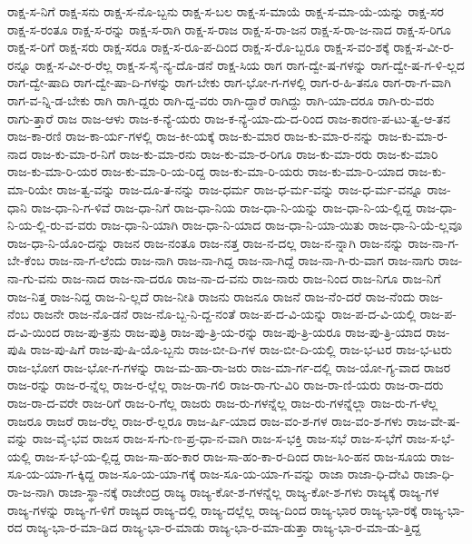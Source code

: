 {ರಾಕ್ಷ-ಸ-ನಿಗೆ
ರಾಕ್ಷ-ಸನು
ರಾಕ್ಷ-ಸ-ನೊ-ಬ್ಬನು
ರಾಕ್ಷ-ಸ-ಬಲ
ರಾಕ್ಷ-ಸ-ಮಾಯೆ
ರಾಕ್ಷ-ಸ-ಮಾ-ಯೆ-ಯನ್ನು
ರಾಕ್ಷ-ಸರ
ರಾಕ್ಷ-ಸ-ರಂತೂ
ರಾಕ್ಷ-ಸ-ರನ್ನು
ರಾಕ್ಷ-ಸ-ರಾಗಿ
ರಾಕ್ಷ-ಸ-ರಾಜ
ರಾಕ್ಷ-ಸ-ರಾ-ಜನ
ರಾಕ್ಷ-ಸ-ರಾ-ಜ-ನಾದ
ರಾಕ್ಷ-ಸ-ರಿಗೂ
ರಾಕ್ಷ-ಸ-ರಿಗೆ
ರಾಕ್ಷ-ಸರು
ರಾಕ್ಷ-ಸರೂ
ರಾಕ್ಷ-ಸ-ರೂ-ಪ-ದಿಂದ
ರಾಕ್ಷ-ಸ-ರೊ-ಬ್ಬರೂ
ರಾಕ್ಷ-ಸ-ವಂ-ಶಕ್ಕೆ
ರಾಕ್ಷ-ಸ-ವೀ-ರ-ರನ್ನೂ
ರಾಕ್ಷ-ಸ-ವೀ-ರ-ರೆಲ್ಲ
ರಾಕ್ಷ-ಸ-ಸೈ-ನ್ಯ-ದೊ-ಡನೆ
ರಾಕ್ಷ-ಸಿಯ
ರಾಗ
ರಾಗ-ದ್ವೇ-ಷ-ಗಳನ್ನು
ರಾಗ-ದ್ವೇ-ಷ-ಗ-ಳಿ-ಲ್ಲದ
ರಾಗ-ದ್ವೇ-ಷಾದಿ
ರಾಗ-ದ್ವೇ-ಷಾ-ದಿ-ಗಳನ್ನು
ರಾಗ-ಬೇಕು
ರಾಗ-ಭೋ-ಗ-ಗಳಲ್ಲಿ
ರಾಗ-ರ-ಹಿ-ತನೂ
ರಾಗ-ರಾ-ಗ-ವಾಗಿ
ರಾಗ-ವ-ನ್ನಿ-ಡ-ಬೇಕು
ರಾಗಿ
ರಾಗಿ-ದ್ದರು
ರಾಗಿ-ದ್ದ-ವರು
ರಾಗಿ-ದ್ದಾರೆ
ರಾಗಿದ್ದು
ರಾಗಿ-ಯಾ-ದರೂ
ರಾಗಿ-ರು-ವರು
ರಾಗು-ತ್ತಾರೆ
ರಾಜ
ರಾಜ-ಆಳು
ರಾಜ-ಕ-ನ್ಯೆ-ಯರು
ರಾಜ-ಕ-ನ್ಯೆ-ಯಾ-ದು-ದ-ರಿಂದ
ರಾಜ-ಕಾರಣ-ಪ-ಟು-ತ್ವ-ಆ-ತನ
ರಾಜ-ಕಾ-ರಣಿ
ರಾಜ-ಕಾ-ರ್ಯ-ಗಳಲ್ಲಿ
ರಾಜ-ಕೀ-ಯಕ್ಕೆ
ರಾಜ-ಕು-ಮಾರ
ರಾಜ-ಕು-ಮಾ-ರ-ನನ್ನು
ರಾಜ-ಕು-ಮಾ-ರ-ನಾದ
ರಾಜ-ಕು-ಮಾ-ರ-ನಿಗೆ
ರಾಜ-ಕು-ಮಾ-ರನು
ರಾಜ-ಕು-ಮಾ-ರ-ರಿಗೂ
ರಾಜ-ಕು-ಮಾ-ರರು
ರಾಜ-ಕು-ಮಾರಿ
ರಾಜ-ಕು-ಮಾ-ರಿ-ಯರ
ರಾಜ-ಕು-ಮಾ-ರಿ-ಯ-ರಿದ್ದ
ರಾಜ-ಕು-ಮಾ-ರಿ-ಯರು
ರಾಜ-ಕು-ಮಾ-ರಿ-ಯಾದ
ರಾಜ-ಕು-ಮಾ-ರಿಯೇ
ರಾಜ-ತ್ವ-ವನ್ನು
ರಾಜ-ದೂ-ತ-ನನ್ನು
ರಾಜ-ಧರ್ಮ
ರಾಜ-ಧ-ರ್ಮ-ವನ್ನು
ರಾಜ-ಧ-ರ್ಮ-ವನ್ನೂ
ರಾಜ-ಧಾನಿ
ರಾಜ-ಧಾ-ನಿ-ಗ-ಳಿವೆ
ರಾಜ-ಧಾ-ನಿಗೆ
ರಾಜ-ಧಾ-ನಿಯ
ರಾಜ-ಧಾ-ನಿ-ಯನ್ನು
ರಾಜ-ಧಾ-ನಿ-ಯ-ಲ್ಲಿದ್ದ
ರಾಜ-ಧಾ-ನಿ-ಯ-ಲ್ಲಿ-ರು-ವ-ವರು
ರಾಜ-ಧಾ-ನಿ-ಯಾಗಿ
ರಾಜ-ಧಾ-ನಿ-ಯಾದ
ರಾಜ-ಧಾ-ನಿ-ಯಾ-ಯಿತು
ರಾಜ-ಧಾ-ನಿ-ಯೆ-ಲ್ಲವೂ
ರಾಜ-ಧಾ-ನಿ-ಯೊಂ-ದನ್ನು
ರಾಜನ
ರಾಜ-ನಂತೂ
ರಾಜ-ನತ್ತ
ರಾಜ-ನ-ದಲ್ಲ
ರಾಜ-ನ-ನ್ನಾಗಿ
ರಾಜ-ನನ್ನು
ರಾಜ-ನಾ-ಗ-ಬೇ-ಕೆಂಬ
ರಾಜ-ನಾ-ಗ-ಲೆಂದು
ರಾಜ-ನಾಗಿ
ರಾಜ-ನಾ-ಗಿದ್ದ
ರಾಜ-ನಾ-ಗಿದ್ದೆ
ರಾಜ-ನಾ-ಗಿ-ರು-ವಾಗ
ರಾಜ-ನಾಗು
ರಾಜ-ನಾ-ಗು-ವನು
ರಾಜ-ನಾದ
ರಾಜ-ನಾ-ದರೂ
ರಾಜ-ನಾ-ದ-ವನು
ರಾಜ-ನಾರು
ರಾಜ-ನಿಂದ
ರಾಜ-ನಿಗೂ
ರಾಜ-ನಿಗೆ
ರಾಜ-ನಿತ್ತ
ರಾಜ-ನಿದ್ದ
ರಾಜ-ನಿ-ಲ್ಲದೆ
ರಾಜ-ನೀತಿ
ರಾಜನು
ರಾಜನೂ
ರಾಜನೆ
ರಾಜ-ನೆಂ-ದರೆ
ರಾಜ-ನೆಂದು
ರಾಜ-ನೆಂಬ
ರಾಜನೇ
ರಾಜ-ನೊ-ಡನೆ
ರಾಜ-ನೊ-ಬ್ಬ-ನಿ-ದ್ದ-ನಂತೆ
ರಾಜ-ಪ-ದ-ವಿ-ಯನ್ನು
ರಾಜ-ಪ-ದ-ವಿ-ಯಲ್ಲಿ
ರಾಜ-ಪ-ದ-ವಿ-ಯಿಂದ
ರಾಜ-ಪು-ತ್ರನು
ರಾಜ-ಪುತ್ರಿ
ರಾಜ-ಪು-ತ್ರಿ-ಯ-ರನ್ನು
ರಾಜ-ಪು-ತ್ರಿ-ಯರೂ
ರಾಜ-ಪು-ತ್ರಿ-ಯಾದ
ರಾಜ-ಪುಷಿ
ರಾಜ-ಪು-ಷಿಗೆ
ರಾಜ-ಪು-ಷಿ-ಯೊ-ಬ್ಬನು
ರಾಜ-ಬೀ-ದಿ-ಗಳ
ರಾಜ-ಬೀ-ದಿ-ಯಲ್ಲಿ
ರಾಜ-ಭ-ಟರ
ರಾಜ-ಭ-ಟರು
ರಾಜ-ಭೋಗ
ರಾಜ-ಭೋ-ಗ-ಗಳನ್ನು
ರಾಜ-ಮ-ಹಾ-ರಾ-ಜರು
ರಾಜ-ಮಾ-ರ್ಗ-ದಲ್ಲಿ
ರಾಜ-ಯೋ-ಗ್ಯ-ವಾದ
ರಾಜರ
ರಾಜ-ರನ್ನು
ರಾಜ-ರ-ನ್ನೆಲ್ಲ
ರಾಜ-ರ-ಲ್ಲೆಲ್ಲ
ರಾಜ-ರಾ-ಗಲಿ
ರಾಜ-ರಾ-ಗು-ವಿರಿ
ರಾಜ-ರಾ-ಣಿ-ಯರು
ರಾಜ-ರಾ-ದರು
ರಾಜ-ರಾ-ದ-ವರೇ
ರಾಜ-ರಿಗೆ
ರಾಜ-ರಿ-ಗೆಲ್ಲ
ರಾಜರು
ರಾಜ-ರು-ಗಳನ್ನೆಲ್ಲ
ರಾಜ-ರು-ಗಳನ್ನೆಲ್ಲಾ
ರಾಜ-ರು-ಗ-ಳೆಲ್ಲ
ರಾಜರೂ
ರಾಜರೆ
ರಾಜ-ರೆಲ್ಲ
ರಾಜ-ರೆ-ಲ್ಲರೂ
ರಾಜ-ರ್ಷಿ-ಯಾದ
ರಾಜ-ವಂ-ಶ-ಗಳ
ರಾಜ-ವಂ-ಶ-ಗಳು
ರಾಜ-ವೇ-ಷ-ವನ್ನು
ರಾಜ-ವೈ-ಭವ
ರಾಜಸ
ರಾಜ-ಸ-ಗು-ಣ-ಪ್ರ-ಧಾ-ನ-ವಾಗಿ
ರಾಜ-ಸ-ಭಕ್ತಿ
ರಾಜ-ಸಭೆ
ರಾಜ-ಸ-ಭೆಗೆ
ರಾಜ-ಸ-ಭೆ-ಯಲ್ಲಿ
ರಾಜ-ಸ-ಭೆ-ಯ-ಲ್ಲಿದ್ದ
ರಾಜ-ಸಾ-ಹಂ-ಕಾರ
ರಾಜ-ಸಾ-ಹಂ-ಕಾ-ರ-ದಿಂದ
ರಾಜ-ಸಿಂ-ಹನ
ರಾಜ-ಸೂಯ
ರಾಜ-ಸೂ-ಯ-ಯಾ-ಗ-ಕ್ಕಿದ್ದ
ರಾಜ-ಸೂ-ಯ-ಯಾ-ಗಕ್ಕೆ
ರಾಜ-ಸೂ-ಯ-ಯಾ-ಗ-ವನ್ನು
ರಾಜಾ
ರಾಜಾ-ಧಿ-ದೇವಿ
ರಾಜಾ-ಧಿ-ರಾ-ಜ-ನಾಗಿ
ರಾಜಾ-ಸ್ಥಾ-ನಕ್ಕೆ
ರಾಜೇಂದ್ರ
ರಾಜ್ಯ
ರಾಜ್ಯ-ಕೋ-ಶ-ಗಳನ್ನೆಲ್ಲ
ರಾಜ್ಯ-ಕೋ-ಶ-ಗಳು
ರಾಜ್ಯಕ್ಕೆ
ರಾಜ್ಯ-ಗಳ
ರಾಜ್ಯ-ಗಳನ್ನು
ರಾಜ್ಯ-ಗ-ಳಿಗೆ
ರಾಜ್ಯದ
ರಾಜ್ಯ-ದಲ್ಲಿ
ರಾಜ್ಯ-ದಲ್ಲೆಲ್ಲ
ರಾಜ್ಯ-ದಿಂದ
ರಾಜ್ಯ-ಭಾರ
ರಾಜ್ಯ-ಭಾ-ರಕ್ಕೆ
ರಾಜ್ಯ-ಭಾ-ರದ
ರಾಜ್ಯ-ಭಾ-ರ-ಮಾ-ಡಿದ
ರಾಜ್ಯ-ಭಾ-ರ-ಮಾಡು
ರಾಜ್ಯ-ಭಾ-ರ-ಮಾ-ಡುತ್ತಾ
ರಾಜ್ಯ-ಭಾ-ರ-ಮಾ-ಡು-ತ್ತಿದ್ದ
}

